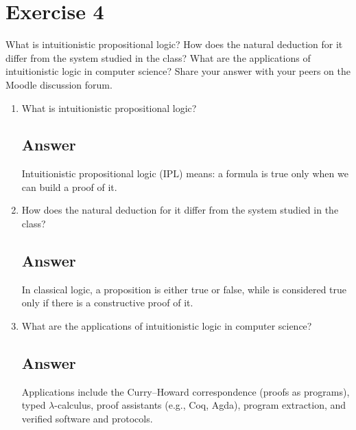 \documentclass[12pt]{article}
\newcommand{\ti}{\text{IPL}}
\begin{document}
	
	\section*{Exercise 4}
	
	\noindent What is intuitionistic propositional logic? How does the natural deduction for it differ from the system studied in the class? What are the applications of intuitionistic logic in computer science? Share your answer with your peers on the Moodle discussion forum.
	
	\bigskip
	
	\begin{enumerate}[start=1,label={\bfseries Part \arabic*:},leftmargin=0in]
		\bigskip\item What is intuitionistic propositional logic?
		
		\subsection*{Answer}
		
			Intuitionistic propositional logic ($\ti$) means: a formula is true only when we can build a proof of it.
		
		\bigskip\item How does the natural deduction for it differ from the system studied in the class?
		
		\subsection*{Answer}
		
			In classical logic, a proposition is either true or false, while is considered true only if there is a constructive proof of it.
		
		\bigskip\item What are the applications of intuitionistic logic in computer science?
		
		\subsection*{Answer}
		
			Applications include the Curry--Howard correspondence (proofs as programs), typed $\lambda$-calculus, proof assistants (e.g., Coq, Agda), program extraction, and verified software and protocols.
		
	\end{enumerate}
	
\end{document}
